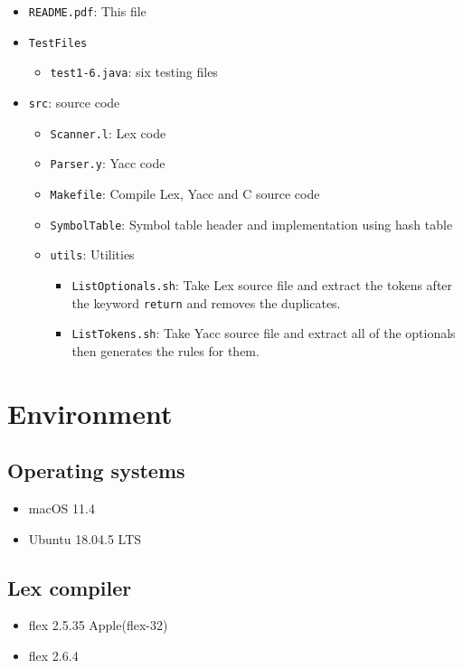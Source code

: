 \documentclass[12pt]{article}
\begin{document}
\begin{itemize}
    \item \texttt{README.pdf}: This file
    \item \texttt{TestFiles}
    \begin{itemize}
	\item \texttt{test1-6.java}: six testing files
    \end{itemize}
    \item \texttt{src}: source code
    \begin{itemize}
	\item \texttt{Scanner.l}: Lex code
	\item \texttt{Parser.y}: Yacc code
	\item \texttt{Makefile}: Compile Lex, Yacc and C source code
	\item \texttt{SymbolTable}: Symbol table header and implementation using hash table
	\item \texttt{utils}: Utilities
	\begin{itemize}
	    \item \texttt{ListOptionals.sh}: Take Lex source file and extract the tokens after the keyword \texttt{return} and removes the duplicates.
	    \item \texttt{ListTokens.sh}: Take Yacc source file and extract all of the optionals then generates the rules for them.
	\end{itemize}
    \end{itemize}
\end{itemize}

\section{Environment}
\subsection{Operating systems}
\begin{itemize}
    \item macOS 11.4
    \item Ubuntu 18.04.5 LTS
\end{itemize}
\subsection{Lex compiler}
\begin{itemize}
    \item flex 2.5.35 Apple(flex-32)
    \item flex 2.6.4
\end{itemize}
\end{document}
